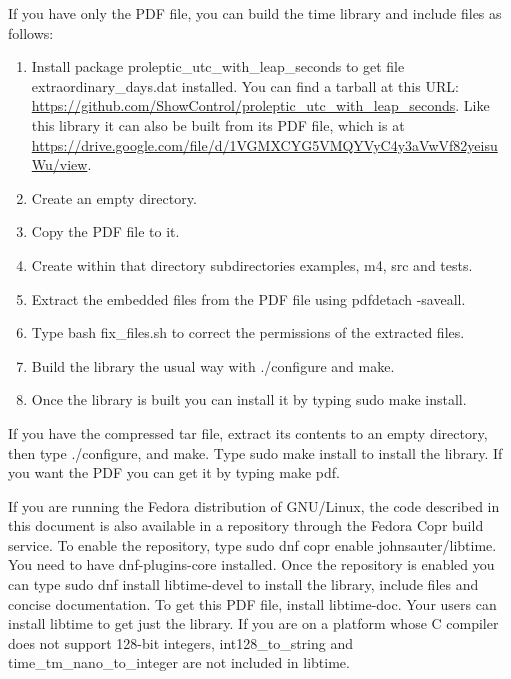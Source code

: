 \documentclass[letterpaper,twoside]{article}
\newcommand{\filename}{\ttfamily\smaller}
\begin{document}
If you have only the PDF file, you can build the time library
and include files as follows:
\begin{enumerate}
\item Install package proleptic\_utc\_with\_leap\_seconds
  to get file {\filename extraordinary\_days.dat} installed.
  You can find a tarball at this URL:
  \href{https://github.com/ShowControl/proleptic_utc_with_leap_seconds}{https://github.com/ShowControl/proleptic\_utc\_with\_leap\_seconds}.
  Like this library it can also be built from its PDF file, which is at
  \href{https://drive.google.com/file/d/1VGMXCYG5VMQYVyC4y3aVwVf82yeisuWu/view}{https://drive.google.com/file/d/1VGMXCYG5VMQYVyC4y3aVwVf82yeisuWu/view}.
\item Create an empty directory.
\item Copy the PDF file to it.
\item Create within that directory subdirectories {\filename examples},
{\filename m4}, {\filename src} and {\filename tests}.
\item Extract the embedded files from the PDF file using pdfdetach -saveall.
\item Type {\ttfamily bash fix\_files.sh} to correct the permissions of
  the extracted files.
\item Build the library the usual way with {\ttfamily ./configure}
and {\ttfamily make}.
\item Once the library is built you can install it by typing
{\ttfamily sudo make install}.
\end{enumerate}

If you have the compressed tar file, extract its contents to an empty
directory, then type {\ttfamily ./configure},
and {\ttfamily make}.  Type {\ttfamily sudo make install} to
install the library.  If you want the PDF you can get it by
typing {\ttfamily make pdf}.

If you are running the Fedora distribution of GNU/Linux, the code
described in this document is also available in a repository
through the Fedora Copr build service.  To enable the repository,
type {\ttfamily sudo dnf copr enable johnsauter/libtime}.
You need to have dnf-plugins-core installed.
Once the repository is enabled you can type
{\ttfamily sudo dnf install libtime-devel} to install
the library, include files and concise documentation.
To get this PDF file, install {\ttfamily libtime-doc}.
Your users can install {\ttfamily libtime} to get just
the library.  If you are on a platform whose C compiler does
not support 128-bit integers, {\ttfamily int128\_to\_string}
and {\ttfamily time\_tm\_nano\_to\_integer} are not included
in libtime.
\end{document}
